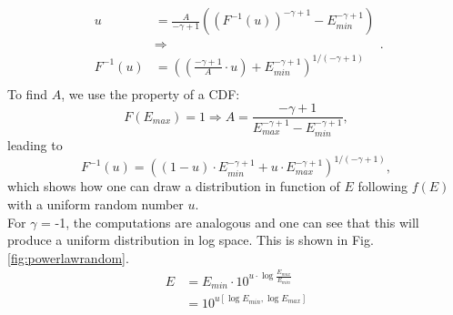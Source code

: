 \begin{appendices}
\begin{equation}
\begin{split}
u &= \frac{A}{-\gamma+1}\left(\left(F^{-1}(u)\right)^{-\gamma+1}-E_{min}^{-\gamma+1}\right)\\
&\Rightarrow \\
            F^{-1}(u) &= \left(\left(\frac{-\gamma+1}{A}\cdot u\right)+ E_{min}^{-\gamma+1}\right)^{1/(-\gamma+1)}\\
\end{split}.
\end{equation}
To find $A$, we use the property of a CDF:
\begin{equation}
F(E_{max}) = 1\Rightarrow A = \frac{-\gamma+1}{E_{max}^{-\gamma+1}-E_{min}^{-\gamma+1}},
\end{equation}
\noindent leading to
\begin{equation}
F^{-1}(u) = \left((1-u) \cdot E_{min}^{-\gamma+1} + u \cdot E_{max}^{-\gamma+1}\right)^{1/(-\gamma+1)},
\end{equation}
\noindent which shows how one can draw a distribution in function of $E$ following $f(E)$ with a uniform random number $u$.\\

\noindent For $\gamma$ = -1, the computations are analogous and one can see that this will produce a uniform distribution in log space. This is shown in Fig. \ref{fig:powerlawrandom}.
            \begin{equation}
            \begin{split}
            E &= E_{min} \cdot 10^{u\cdot \log{\frac{E_{max}}{E_{min}}}}\\
            &= 10^{u[\log{E_{min}},\log{E_{max}}]}
\end{split}
\end{equation}
            

\end{appendices}
